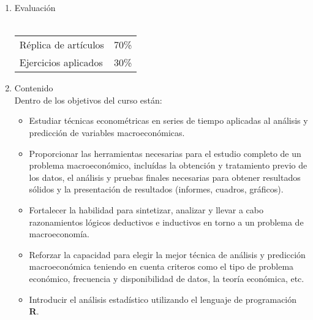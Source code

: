 \documentclass{article}\usepackage[]{graphicx}\usepackage[]{color}
\begin{document}
\begin{enumerate}
      \item Evaluación\\ 
      \\
  \begin{left}
  \begin{tabular}{ l  l }
    Réplica de artículos &70\%\\
    Ejercicios aplicados &30\%
  \end{tabular}
\end{left}

  \item Contenido\\
  Dentro de los objetivos del curso están:
    \begin{itemize}
      \item Estudiar técnicas econométricas en series de tiempo aplicadas al análisis y predicción de variables macroeconómicas.
      \item Proporcionar las herramientas necesarias para el estudio completo de un problema macroeconómico, incluídas la obtención y tratamiento previo de los datos, el análisis y pruebas finales necesarias para obtener resultados sólidos y la presentación de resultados (informes, cuadros, gráficos).
      \item Fortalecer la habilidad para sintetizar, analizar y llevar a cabo razonamientos lógicos deductivos e inductivos en torno a un problema de macroeconomía.
      \item Reforzar la capacidad para elegir la mejor técnica de análisis y predicción macroeconómica teniendo en cuenta criteros como el tipo de problema económico, frecuencia y disponibilidad de datos, la teoría económica, etc.
      \item Introducir el análisis estadístico utilizando el lenguaje de programación \textbf{\textsf{R}}.
    \end{itemize}


\end{enumerate}
\end{document}
